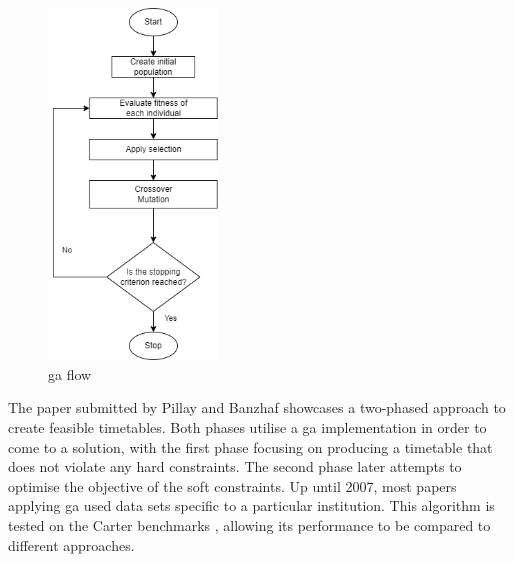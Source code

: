 \begin{figure}[h]
	\centering
	\includegraphics[width=0.40\textwidth]{images/related_works/GA/GA.png} 
	\caption{\acrlong{ga} flow}
	\label{fig:GA}
\end{figure}

The paper submitted by Pillay and Banzhaf \cite{pillay2010} showcases a two-phased approach to create feasible timetables. Both phases utilise a \acrshort{ga} implementation in order to come to a solution, with the first phase focusing on producing a timetable that does not violate any hard constraints. The second phase later attempts to optimise the objective of the soft constraints. Up until 2007, most papers applying \acrshort{ga} used data sets specific to a particular institution. This algorithm is tested on the Carter benchmarks \cite{carter1996}, allowing its performance to be compared to different approaches.

